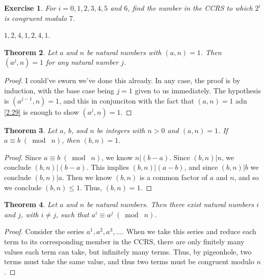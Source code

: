\documentclass{article}
\newtheorem{thm}{Theorem}[section]
\newtheorem{ex}[thm]{Exercise}
\numberwithin{equation}{thm}
\providecommand{\gmod}[1]{\; (\bmod \; #1)}
\begin{document}
\begin{ex} \label{4.1}
  For $i = 0, 1, 2, 3, 4, 5$ and $6$, find the number in the CCRS to which $2^i$ is congruent modulo $7$.
\end{ex}

$1, 2, 4, 1, 2, 4, 1$.



\begin{thm} \label{4.2}
  Let $a$ and $n$ be natural numbers with $(a, n) = 1$. Then $(a^j, n) = 1$ for any natural number $j$.
\end{thm}

\begin{proof}
  I could've sworn we've done this already. In any case, the proof is by induction, with the base case being $j=1$ given to us immediately. The hypothesis is $(a^{j-1},n) = 1$, and this in conjunciton with the fact that $(a, n) = 1$ adn \ref{2.29} is enough to show $(a^j, n) = 1$.
\end{proof}



\begin{thm} \label{4.3}
  Let $a$, $b$, and $n$ be integers with $n > 0$ and $(a, n) = 1$. If $a \equiv b \gmod n$, then $(b, n) = 1$.
\end{thm}

\begin{proof}
  Since $a \equiv b \gmod n$, we know $n | (b - a)$. Since $(b, n) | n$, we conclude $(b, n) | (b-a)$. This implies $(b, n) | (a-b)$, and since $(b, n) | b$ we conclude $(b, n) | a$. Then we know $(b, n)$ is a common factor of $a$ and $n$, and so we conclude $(b, n) \leq 1$. Thus, $(b, n) = 1$.
\end{proof}



\begin{thm} \label{4.4}
  Let $a$ and $n$ be natural numbers. Then there exist natural numbers $i$ and $j$, with $i \neq j$, such that $a^i \equiv a^j \gmod n$.
\end{thm}

\begin{proof}
  Consider the series $a^1, a^2, a^3, \ldots$. When we take this series and reduce each term to its corresponding member in the CCRS, there are only finitely many values each term can take, but infinitely many terms. Thus, by pigeonhole, two terms must take the same value, and thus two terms must be congruent modulo $n$.
\end{proof}
\end{document}
